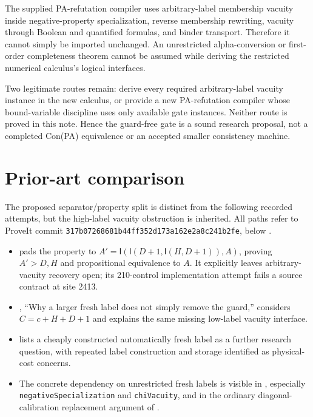 \documentclass[11pt]{article}
\newcommand{\I}{\mathsf I}
\begin{document}
The supplied PA-refutation compiler uses arbitrary-label membership vacuity
inside negative-property specialization, reverse membership rewriting,
vacuity through Boolean and quantified formulas, and binder transport.
Therefore it cannot simply be imported unchanged. An unrestricted
alpha-conversion or first-order completeness theorem cannot be assumed
while deriving the restricted numerical calculus's logical interfaces.

Two legitimate routes remain: derive every required arbitrary-label
vacuity instance in the new calculus, or provide a new PA-refutation
compiler whose bound-variable discipline uses only available gate instances.
Neither route is proved in this note. Hence the guard-free gate is a sound
research proposal, not a completed Con(PA) equivalence or an accepted
smaller consistency machine.

\section{Prior-art comparison}
The proposed separator/property split is distinct from the following
recorded attempts, but the high-label vacuity obstruction is inherited.
All paths refer to ProveIt commit
\texttt{317b07268681b44ff352d173a162e2a8c241b2fe}, below
.
\begin{itemize}
\item {} pads the
property to $A'=\I(\I(D+1,\I(H,D+1)),A)$, proving $A'>D,H$ and propositional
equivalence to $A$. It explicitly leaves arbitrary-vacuity recovery open;
its 210-control implementation attempt fails a source contract at site 2413.
\item {},
``Why a larger fresh label does not simply remove the guard,'' considers
$C=c+H+D+1$ and explains the same missing low-label vacuity interface.
\item {} lists a cheaply constructed
automatically fresh label as a further research question, with repeated
label construction and storage identified as physical-cost concerns.
\item The concrete dependency on unrestricted fresh labels is visible in
, especially
\texttt{negativeSpecialization} and \texttt{chiVacuity}, and in the ordinary
diagonal-calibration replacement argument of
.
\end{itemize}
\end{document}
